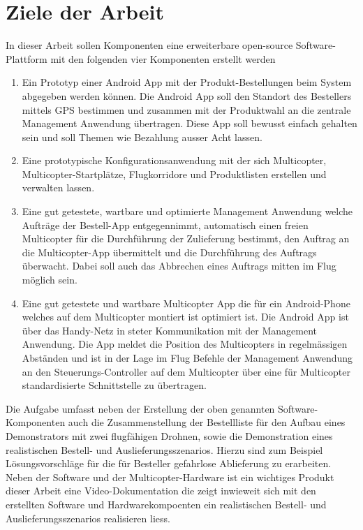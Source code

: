 \section*{Ziele der Arbeit}
In dieser Arbeit sollen Komponenten eine erweiterbare open-source Software-Plattform mit den folgenden vier Komponenten erstellt werden 
\begin{enumerate}
	\item{Ein Prototyp einer Android App mit der Produkt-Bestellungen beim System abgegeben werden können. Die Android App soll den Standort des Bestellers mittels GPS bestimmen und zusammen mit der Produktwahl an die zentrale Management Anwendung übertragen. Diese App soll bewusst einfach gehalten sein und soll Themen wie Bezahlung ausser Acht lassen.}
	\item{Eine prototypische Konfigurationsanwendung mit der sich Multicopter, Multicopter-Startplätze, Flugkorridore und Produktlisten erstellen und verwalten lassen.}
	\item{Eine gut getestete, wartbare und optimierte Management Anwendung welche Aufträge der Bestell-App entgegennimmt, automatisch einen freien Multicopter für die Durchführung der Zulieferung bestimmt, den Auftrag an die Multicopter-App übermittelt und die Durchführung des Auftrags überwacht. Dabei soll auch das Abbrechen eines Auftrags mitten im Flug möglich sein.}
	\item{Eine gut getestete und wartbare Multicopter App die für ein Android-Phone welches auf dem Multicopter montiert ist optimiert ist. Die Android App ist über das Handy-Netz in steter Kommunikation mit der Management Anwendung. Die App meldet die Position des Multicopters in regelmässigen Abständen und ist in der Lage im Flug Befehle der Management Anwendung an den Steuerungs-Controller auf dem Multicopter über eine für Multicopter standardisierte Schnittstelle zu übertragen.}
\end{enumerate}
Die Aufgabe umfasst neben der Erstellung der oben genannten Software-Komponenten auch die Zusammenstellung der Bestellliste für den Aufbau eines Demonstrators mit zwei flugfähigen Drohnen, sowie die Demonstration eines realistischen Bestell- und Auslieferungsszenarios. Hierzu sind zum Beispiel Lösungsvorschläge für die für Besteller gefahrlose Ablieferung zu erarbeiten. Neben der Software und der Multicopter-Hardware ist ein wichtiges Produkt dieser Arbeit eine Video-Dokumentation die zeigt inwieweit sich mit den erstellten Software und Hardwarekompoenten ein realistischen Bestell- und Auslieferungsszenarios realisieren liess.
